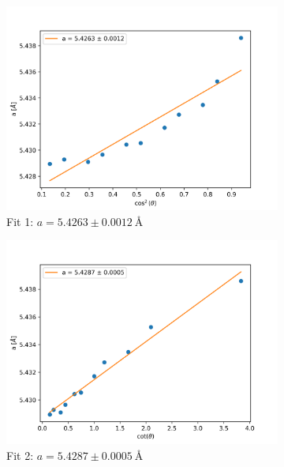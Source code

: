 \documentclass{article}
\begin{document}
\begin{figure}[h]
	\centering
	\begin {subfigure}{0.3\textwidth}
		\centering
		\includegraphics[width=\textwidth]{Figures/SiCos.png}
		\caption{Fit 1: $a=5.4263 \pm  \SI{0.0012}{\angstrom} $}
		\label{fig:SiFit1}
	\end{subfigure}
	\hfill
	\begin {subfigure}{0.3\textwidth}
		\centering
		\includegraphics[width=\textwidth]{Figures/SiCot.png}
		\caption{Fit 2: $a=5.4287 \pm  \SI{0.0005}{\angstrom} $}
		\label{fig:SiFit2}
	\end{subfigure}
	\hfill
	\begin {subfigure}{0.3\textwidth}
		\centering

\end{subfigure}
\end{figure}
\end{document}
